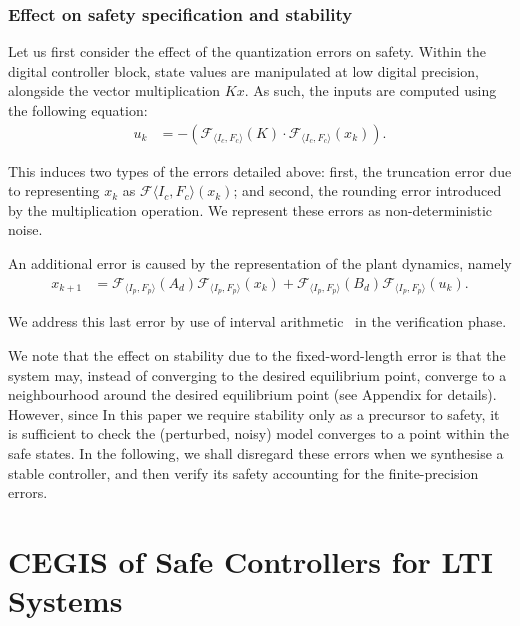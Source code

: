 \documentclass[runningheads,a4paper]{llncs}
\begin{document}
\subsubsection{Effect on safety specification and stability}

Let us first consider the effect of the quantization errors on safety. 
Within the digital controller block, 
state values are manipulated at low digital precision, 
alongside the vector multiplication $Kx$.   
As such, the inputs are computed using the following equation: 
\begin{align*}
u_{k}&=-(\mathcal{F}_{\langle I_c,F_c \rangle}(K)\cdot\mathcal{F}_{\langle I_c,F_c \rangle}(x_{k})). 
\end{align*}

This induces two types of the errors detailed above:  
first, the truncation error due to representing $x_k$ as $\mathcal{F}{\langle I_c,F_c \rangle}(x_{k})$; 
and second, the rounding error introduced by the multiplication operation. 
We represent these errors as non-deterministic noise.

An additional error is caused by the representation of the plant dynamics, namely 
\begin{align*}
x_{k+1} &=\mathcal{F}_{\langle I_p,F_p \rangle}(A_d) \mathcal{F}_{\langle I_p,F_p \rangle}(x_{k}) + \mathcal{F}_{\langle I_p,F_p \rangle}(B_d)\mathcal{F}_{\langle I_p,F_p \rangle}(u_{k}).
\end{align*}

We address this last error by use of interval arithmetic~\cite{moore1966interval} in the verification phase.

We note that the effect on stability due to the fixed-word-length error is that the system may, 
instead of converging to the desired equilibrium point, 
converge to a neighbourhood around the desired equilibrium point (see Appendix for details). 
However, since In this paper we require stability only as a precursor to safety, 
it is sufficient to check the (perturbed, noisy) model converges to a point within the safe states. 
In the following, we shall disregard these errors when we synthesise a stable controller, 
and then verify its safety accounting for the finite-precision errors. 

\section{CEGIS of Safe Controllers for LTI Systems} 
\label{sec:CEGARIS} 
\end{document}
